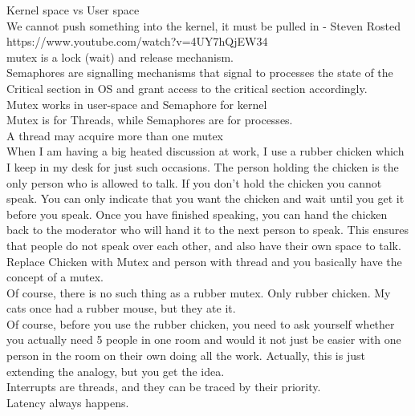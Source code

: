 \documentclass[11pt, a4paper, oneside]{article}
\theoremstyle{definition}
\begin{document}
Kernel space vs User space\\

We cannot push something into the kernel, it must be pulled in - Steven Rosted\\
https://www.youtube.com/watch?v=4UY7hQjEW34\\

mutex is a lock (wait) and release mechanism. \\
Semaphores are signalling mechanisms that signal to processes the state of the Critical section in OS and grant access to the critical section accordingly.\\

Mutex works in user-space and Semaphore for kernel\\
Mutex is for Threads, while Semaphores are for processes.\\
A thread may acquire more than one mutex\\

When I am having a big heated discussion at work, I use a rubber chicken which I keep in my desk for just such occasions. The person holding the chicken is the only person who is allowed to talk. If you don't hold the chicken you cannot speak. You can only indicate that you want the chicken and wait until you get it before you speak. Once you have finished speaking, you can hand the chicken back to the moderator who will hand it to the next person to speak. This ensures that people do not speak over each other, and also have their own space to talk.\\

Replace Chicken with Mutex and person with thread and you basically have the concept of a mutex.\\

Of course, there is no such thing as a rubber mutex. Only rubber chicken. My cats once had a rubber mouse, but they ate it.\\

Of course, before you use the rubber chicken, you need to ask yourself whether you actually need 5 people in one room and would it not just be easier with one person in the room on their own doing all the work. Actually, this is just extending the analogy, but you get the idea.\\

Interrupts are threads, and they can be traced by their priority.\\

Latency always happens.\\
\end{document}
